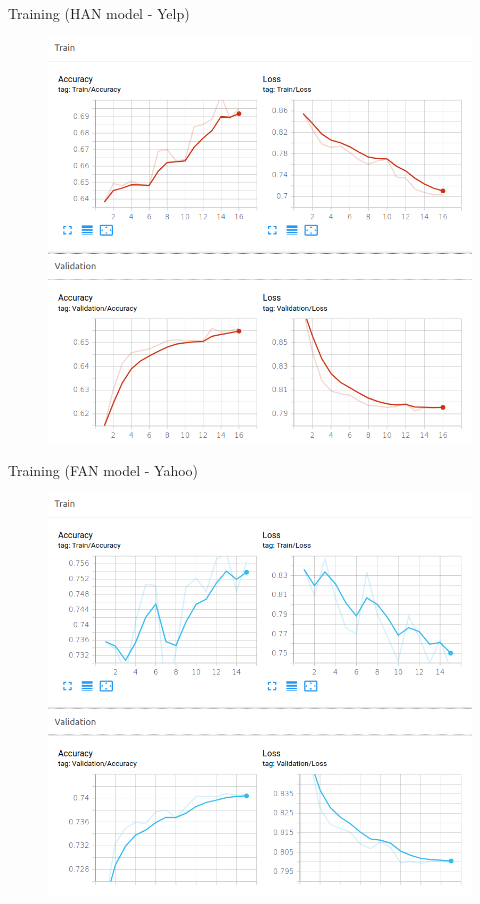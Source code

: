 \documentclass[10pt]{beamer}
\begin{document}
\begin{frame}{Training (HAN model - Yelp)}

\begin{figure}[H]
\centering
\includegraphics[scale=0.3]{img/yelp-han.png}
\end{figure}

\end{frame}

\begin{frame}{Training (FAN model - Yahoo)}

\begin{figure}[H]
\centering
\includegraphics[scale=0.3]{img/yahoo-fan.png}
\end{figure}

\end{frame}
\end{document}
